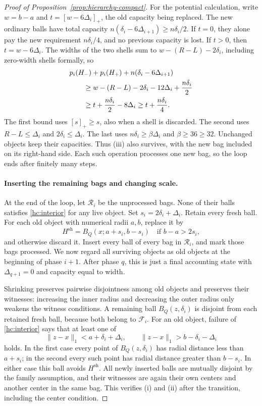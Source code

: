 \documentclass[11pt]{amsart}
\theoremstyle{definition}
\theoremstyle{remark}
\numberwithin{equation}{section}
\begin{document}
\begin{proof}[Proof of Proposition~\ref{prop:hierarchy-compact}]
For the potential calculation, write \(w=b-a\) and
\(t=[w-6\Delta_i]_+\), the old capacity being replaced.  The new
ordinary balls have total capacity
\(n(\delta_i-6\Delta_{i+1})\ge n\delta_i/2\).
If \(t=0\), they alone pay the new requirement \(n\delta_i/4\),
and no previous capacity is lost.  If \(t>0\), then
\(t=w-6\Delta_i\).  The widths of the two shells sum to
\(w-(R-L)-2\delta_i\), including zero-width shells formally, so
\begin{align}
\label{hc:split-capacity}
 &p_i(H_-)+p_i(H_+)+n(\delta_i-6\Delta_{i+1})\notag\\
 &\qquad\ge w-(R-L)-2\delta_i-12\Delta_i
              +\frac{n\delta_i}{2}\notag\\
 &\qquad\ge t+\frac{n\delta_i}{2}-8\Delta_i
 \ge t+\frac{n\delta_i}{4}.
\end{align}
The first bound uses \([s]_+\ge s\), also when a shell is discarded.
The second uses \(R-L\le\Delta_i\) and
\(2\delta_i\le\Delta_i\).  The last uses
\(n\delta_i\ge \beta\Delta_i\) and \(\beta\ge36\ge32\).
Unchanged objects keep their capacities.  Thus (iii) also survives,
with the new bag included on its right-hand side.  Each such operation
processes one new bag, so the loop ends after finitely many steps.

\paragraph{Inserting the remaining bags and changing scale.}
At the end of the loop, let \(\mathcal R_i\) be the unprocessed bags.
None of their balls satisfies \eqref{hc:interior} for any live object.
Set
\(s_i=2\delta_i+\Delta_i\).
Retain every fresh ball.  For each old object with numerical radii
\(a,b\), replace it by
\begin{equation}
\label{hc:shrink}
 H^{\mathrm{sh}}=B_Q(x;a+s_i,b-s_i)
 \quad\text{if }b-a>2s_i,
\end{equation}
and otherwise discard it.  Insert every ball of every bag in
\(\mathcal R_i\), and mark those bags processed.  We now regard all
surviving objects as old objects at the beginning of phase \(i+1\).
After phase \(q\), this is just a final accounting state with
\(\Delta_{q+1}=0\) and capacity equal to width.

Shrinking preserves pairwise disjointness among old objects and
preserves their witnesses: increasing the inner radius and decreasing
the outer radius only weakens the witness conditions.  A remaining
ball \(B_Q(z,\delta_i)\) is disjoint from each retained fresh ball,
because both belong to \(\mathcal F_i\).  For an old object, failure
of \eqref{hc:interior} says that at least one of
\[
 \|z-x\|_1<a+\delta_i+\Delta_i,
 \qquad
 \|z-x\|_1>b-\delta_i-\Delta_i
\]
holds.  In the first case every point of \(B_Q(z,\delta_i)\) has
radial distance less than \(a+s_i\); in the second every such point
has radial distance greater than \(b-s_i\).  In either case this ball
avoids \(H^{\mathrm{sh}}\).  All newly inserted balls are mutually
disjoint by the family assumption, and their witnesses are again
their own centers and another center in the same bag.  This verifies
(i) and (ii) after the transition, including the center condition.


\end{proof}
\end{document}
